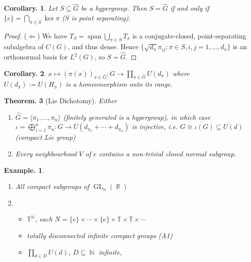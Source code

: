 \documentclass[11pt, a4paper]{memoir}
\DeclareMathOperator{\N}{{\mathbb{N}}}
\DeclareMathOperator{\R}{{\mathbb{R}}}
\newcommand{\impl}{{($\Longleftarrow$)\hspace{0.2cm}}}
\theoremstyle{change}
\newtheorem{theorem}{Theorem.}[section]
\newtheorem{corollary}[theorem]{Corollary.}
\theoremstyle{plain}
\theoremstyle{nonumberplain}
\newtheorem{example}{Example.}
\newtheorem{proof}{Proof}
\DeclareMathOperator{\GL}{GL}
\DeclareMathOperator{\spn}{span}
\numberwithin{equation}{section}
\begin{document}
\begin{corollary}
    Let $S\subseteq\widehat{G}$ be a hypergroup.
    Then $S=\widehat{G}$ if and only if $\{e\}=\bigcap_{\pi\in S}\ker\pi$ ($S$ is point separating).
\end{corollary}
\begin{proof}
    \impl
    We have $T_S=\spn\bigcup_{\pi\in S}T_\pi$ is a conjugate-closed, point-separating subalgebra of $C(G)$, and thus dense.
    Hence $\{\sqrt{d_\pi}\pi_{ij}:\pi\in S,i,j=1,\ldots,d_\pi\}$ is an orthonormal basis for $L^2(G)$, so $S=\widehat{G}$.
\end{proof}
\begin{corollary}
    $x\mapsto(\pi(x))_{\pi\in\widehat{G}}:G\to\prod_{\pi\in \widehat{G}}U(d_\pi)$ where $U(d_\pi):=U(H_\pi)$ is a homeomorphism onto its range.
\end{corollary}
\begin{theorem}[Lie Dichotomy]
    Either
    \begin{enumerate}[nl,r]
        \item $\widehat{G}=\langle\pi_1,\ldots,\pi_n\rangle$ (finitely generated is a hypergroup), in which case $\iota=\bigoplus_{i=1}^n\pi_n:G\to U(d_{\pi_1}+\cdots+d_{\pi_n})$ is injective, i.e. $G\cong\iota(G)\subseteq U(d)$ (compact Lie group)
        \item Every neighbourhood $V$ of $e$ contains a non-trivial closed normal subgroup.
    \end{enumerate}
\end{theorem}
\begin{example}
    \begin{enumerate}[nl,r]
        \item All compact subgroups of $\GL_n(\R)$
        \item
            \begin{itemize}[nl]
                \item $\mathbb{T}^{\N}$, each $N=\{e\}\times\cdots\times\{e\}\times\mathbb{T}\times\mathbb{T}\times\cdots$
                \item totally disconnected infinite compact groups (A1)
                \item $\prod_{d\in D}U(d)$, $D\subseteq\N$ infinite,
            \end{itemize}
    \end{enumerate}
\end{example}
\end{document}
